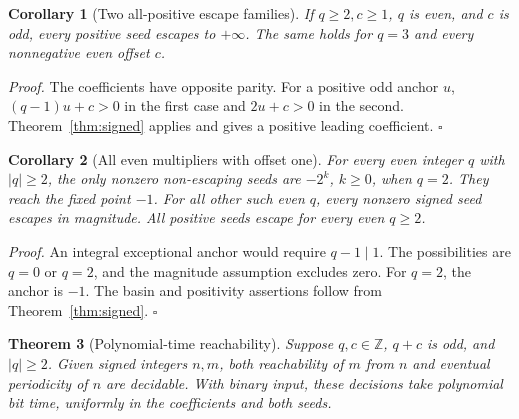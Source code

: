 \documentclass[11pt,letterpaper]{article}
\newcommand{\Z}{\mathbb{Z}}
\newtheorem{theorem}{Theorem}
\newtheorem{corollary}[theorem]{Corollary}
\newenvironment{proof}{\noindent\textit{Proof.}}{\hfill\(\square\)}
\begin{document}
\begin{corollary}[Two all-positive escape families]
If \(q\ge2,c\ge1\), \(q\) is even, and \(c\) is odd, every positive
seed escapes to \(+\infty\). The same holds for \(q=3\) and every
nonnegative even offset \(c\).
\end{corollary}

\begin{proof}
The coefficients have opposite parity. For a positive odd anchor \(u\),
\((q-1)u+c>0\) in the first case and \(2u+c>0\) in the second.
Theorem~\ref{thm:signed} applies and gives a positive leading coefficient.
\end{proof}

\begin{corollary}[All even multipliers with offset one]
For every even integer \(q\) with \(|q|\ge2\), the only nonzero
non-escaping seeds are \(-2^k\), \(k\ge0\), when \(q=2\).
They reach the fixed point \(-1\). For all other such even \(q\),
every nonzero signed seed escapes in magnitude. All positive seeds
escape for every even \(q\ge2\).
\end{corollary}

\begin{proof}
An integral exceptional anchor would require \(q-1\mid1\).
The possibilities are \(q=0\) or \(q=2\), and the magnitude assumption
excludes zero. For \(q=2\), the anchor is \(-1\).
The basin and positivity assertions follow from Theorem~\ref{thm:signed}.
\end{proof}

\begin{theorem}[Polynomial-time reachability]
\label{thm:reachability}
Suppose \(q,c\in\Z\), \(q+c\) is odd, and \(|q|\ge2\).
Given signed integers \(n,m\), both reachability of \(m\) from \(n\)
and eventual periodicity of \(n\) are decidable. With binary input,
these decisions take polynomial bit time, uniformly in the coefficients
and both seeds.
\end{theorem}
\end{document}
